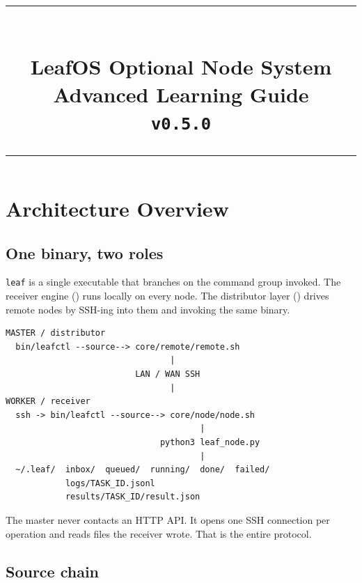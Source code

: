 \documentclass[11pt,a4paper]{article}
\title{%
  \textcolor{leafcyan}{\rule{\linewidth}{1.5pt}}\\[8pt]
  \textbf{LeafOS Optional Node System}\\[4pt]
  \large Advanced Learning Guide\\[2pt]
  \normalsize\texttt{v0.5.0}\\[6pt]
  \textcolor{leafcyan}{\rule{\linewidth}{0.8pt}}
}
\author{}
\date{}
\begin{document}
\maketitle\thispagestyle{empty}

\begin{center}
\end{center}

\tableofcontents
\newpage

\section{Architecture Overview}

\subsection{One binary, two roles}

\texttt{leaf} is a single executable that branches on the command group invoked.
The receiver engine () runs locally on every node.
The distributor layer () drives remote nodes by
SSH-ing into them and invoking the same binary.

\begin{lstlisting}[language={}]
MASTER / distributor
  bin/leafctl --source--> core/remote/remote.sh
								 |
						  LAN / WAN SSH
								 |
WORKER / receiver
  ssh -> bin/leafctl --source--> core/node/node.sh
									   |
							   python3 leaf_node.py
									   |
  ~/.leaf/  inbox/  queued/  running/  done/  failed/
			logs/TASK_ID.jsonl
			results/TASK_ID/result.json
\end{lstlisting}

The master never contacts an HTTP API. It opens one SSH connection per operation
and reads files the receiver wrote. That is the entire protocol.

\subsection{Source chain}
\end{document}

